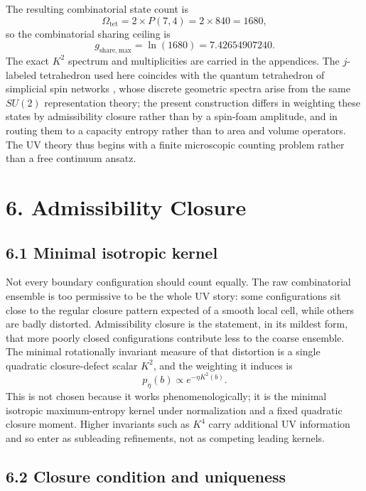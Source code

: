 \documentclass[11pt]{article}
\begin{document}
The resulting combinatorial state count is
\[
\Omega_{\mathrm{tet}}=2\times P(7,4)=2\times 840=1680,
\]
so the combinatorial sharing ceiling is
\[
g_{\mathrm{share,max}}=\ln(1680)=7.42654907240.
\]
The exact $K^2$ spectrum and multiplicities are carried in the appendices. The $j$-labeled tetrahedron used here coincides with the quantum tetrahedron of simplicial spin networks \citep{Barbieri1998,BaezBarrett1999}, whose discrete geometric spectra \citep{RovelliSmolin1995} arise from the same $SU(2)$ representation theory; the present construction differs in weighting these states by admissibility closure rather than by a spin-foam amplitude, and in routing them to a capacity entropy rather than to area and volume operators. The UV theory thus begins with a finite microscopic counting problem rather than a free continuum ansatz.

\section{6. Admissibility Closure}

\subsection{6.1 Minimal isotropic kernel}

Not every boundary configuration should count equally. The raw combinatorial ensemble is too permissive to be the whole UV story: some configurations sit close to the regular closure pattern expected of a smooth local cell, while others are badly distorted. Admissibility closure is the statement, in its mildest form, that more poorly closed configurations contribute less to the coarse ensemble. The minimal rotationally invariant measure of that distortion is a single quadratic closure-defect scalar $K^2$, and the weighting it induces is
\[
p_\eta(b)\propto e^{-\eta K^2(b)}.
\]
This is not chosen because it works phenomenologically; it is the minimal isotropic maximum-entropy kernel under normalization and a fixed quadratic closure moment. Higher invariants such as $K^4$ carry additional UV information and so enter as subleading refinements, not as competing leading kernels.

\subsection{6.2 Closure condition and uniqueness}
\end{document}
